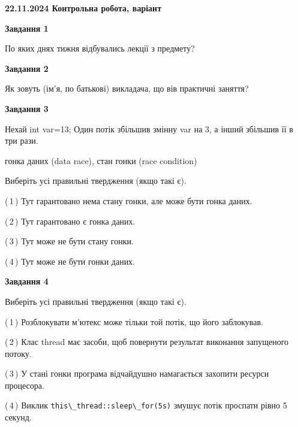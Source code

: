 \documentclass[12pt, ukrainian]{article}
\def\code#1{\Verb!#1!}
\begin{document}
\begin {large}

\textbf{22.11.2024 Контрольна робота, варіант  }\par


{

\begin{center}
\textbf{Завдання 1}
\end{center}

По яких днях тижня відбувались лекції з предмету?


\begin{center}
\textbf{Завдання 2}
\end{center}

Як зовуть (ім'я, по батькові) викладача, що вів практичні заняття?


\begin{center}
\textbf{Завдання 3}
\end{center}

Нехай int var=13; Один потік збільшив змінну var на 3, а інший збільшив її в три рази.

гонка даних (data race), стан гонки (race condition)

Виберіть усі правильні твердження (якщо такі є).\par
\vspace{2mm}
(\,1\,) Тут гарантовано нема стану гонки, але може бути гонка даних.%

(\,2\,) Тут гарантовано є гонка даних.%

(\,3\,) Тут може не бути стану гонки.%

(\,4\,) Тут може не бути гонки даних.%


\begin{center}
\textbf{Завдання 4}
\end{center}

Виберіть усі правильні твердження (якщо такі є).\par
\vspace{2mm}

(\,1\,) Розблокувати м’ютекс може тільки той потік, що його заблокував.%

(\,2\,) Клас thread має засоби, щоб повернути результат виконання запущеного потоку.%

(\,3\,) У стані гонки програма відчайдушно намагається захопити ресурси процесора.%

(\,4\,) Виклик \code{this\_thread::sleep\_for(5s)} змушує потік проспати рівно 5 секунд.%


}
\end{large}
\end{document}
